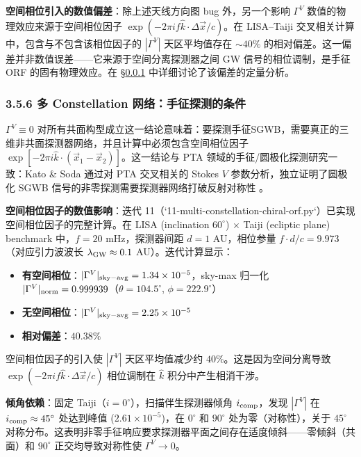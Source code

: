 \documentclass[12pt,a4paper]{article}
\begin{document}
\textbf{空间相位引入的数值偏差}：除上述天线方向图 bug 外，另一个影响 $\Gamma^V$ 数值的物理效应来源于空间相位因子 $\exp(-2\pi i f \hat{k} \cdot \Delta\vec{x}/c)$。在 LISA--Taiji 交叉相关计算中，包含与不包含该相位因子的 $|\Gamma^V|$ 天区平均值存在 $\sim 40\%$ 的相对偏差。这一偏差并非数值误差——它来源于空间分离探测器之间 GW 信号的相位调制，是手征 ORF 的固有物理效应。在 \S\ref{sec:3.5.6} 中详细讨论了该偏差的定量分析。

\subsubsection{3.5.6 多 Constellation 网络：手征探测的条件}\label{sec:3.5.6}

$\Gamma^V \equiv 0$ 对所有共面构型成立这一结论意味着：要探测手征SGWB，需要真正的三维非共面探测器网络，并且计算中必须包含空间相位因子 $\exp[-2\pi i \hat{k} \cdot (\vec{x}_1 - \vec{x}_2)]$。这一结论与 PTA 领域的手征/圆极化探测研究一致：Kato \& Soda 通过对 PTA 交叉相关的 Stokes $V$ 参数分析，独立证明了圆极化 SGWB 信号的非零探测需要探测器网络打破反射对称性 \cite{ref13}。

\textbf{空间相位因子的数值影响}：迭代 11（`11-multi-constellation-chiral-orf.py`）已实现空间相位因子的完整计算。在 LISA (inclination $60^\circ$) $\times$ Taiji (ecliptic plane) benchmark 中，$f = 20$ mHz，探测器间距 $d = 1$ AU，相位参量 $f \cdot d/c = 9.973$（对应引力波波长 $\lambda_{\rm GW} \approx 0.1$ AU）。迭代计算显示：

\begin{itemize}
  \item \textbf{有空间相位}：$|\Gamma^V|_{\rm sky-avg} = 1.34 \times 10^{-5}$，sky-max 归一化 $|\Gamma^V|_{\rm norm} = 0.999939$（$\theta = 104.5^\circ$, $\phi = 222.9^\circ$）
  \item \textbf{无空间相位}：$|\Gamma^V|_{\rm sky-avg} = 2.25 \times 10^{-5}$
  \item \textbf{相对偏差}：$40.38\%$
\end{itemize}

空间相位因子的引入使 $|\Gamma^V|$ 天区平均值减少约 $40\%$。这是因为空间分离导致 $\exp(-2\pi i f \hat{k} \cdot \Delta\vec{x}/c)$ 相位调制在 $\hat{k}$ 积分中产生相消干涉。

\textbf{倾角依赖}：固定 Taiji（$i = 0^\circ$），扫描伴生探测器倾角 $i_{\rm comp}$，发现 $|\Gamma^V|$ 在 $i_{\rm comp} \approx 45^\circ$ 处达到峰值 ($2.61 \times 10^{-5}$)，在 $0^\circ$ 和 $90^\circ$ 处为零（对称性），关于 $45^\circ$ 对称分布。这表明非零手征响应要求探测器平面之间存在适度倾斜——零倾斜（共面）和 $90^\circ$ 正交均导致对称性使 $\Gamma^V \to 0$。
\end{document}
